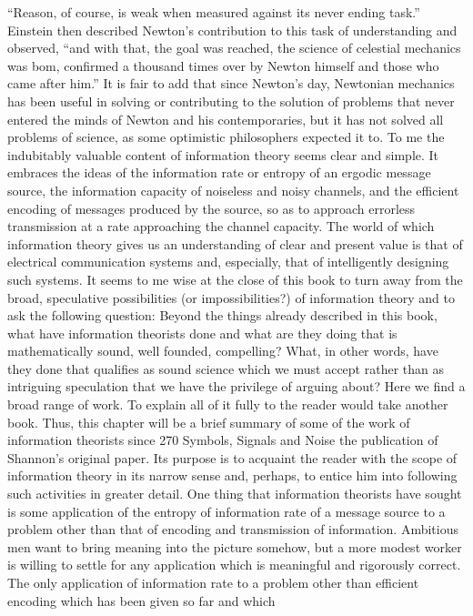 {{{{{{{{{{{{“Reason, of course, is weak when measured against its never
ending task.” Einstein then described Newton’s contribution to
this task of understanding and observed, “and with that, the goal
was reached, the science of celestial mechanics was bom, confirmed
a thousand times over by Newton himself and those who came
after him.”
It is fair to add that since Newton’s day, Newtonian mechanics
has been useful in solving or contributing to the solution of problems
that never entered the minds of Newton and his contemporaries,
but it has not solved all problems of science, as some
optimistic philosophers expected it to.
To me the indubitably valuable content of information theory
seems clear and simple. It embraces the ideas of the information
rate or entropy of an ergodic message source, the information
capacity of noiseless and noisy channels, and the efficient encoding
of messages produced by the source, so as to approach errorless
transmission at a rate approaching the channel capacity. The
world of which information theory gives us an understanding of
clear and present value is that of electrical communication systems
and, especially, that of intelligently designing such systems.
It seems to me wise at the close of this book to turn away from
the broad, speculative possibilities (or impossibilities?) of information
theory and to ask the following question: Beyond the things
already described in this book, what have information theorists
done and what are they doing that is mathematically sound, well
founded, compelling? What, in other words, have they done that
qualifies as sound science which we must accept rather than as
intriguing speculation that we have the privilege of arguing about?
Here we find a broad range of work. To explain all of it fully to
the reader would take another book. Thus, this chapter will be a
brief summary of some of the work of information theorists since
270
Symbols, Signals and Noise
the publication of Shannon’s original paper. Its purpose is to
acquaint the reader with the scope of information theory in its
narrow sense and, perhaps, to entice him into following such
activities in greater detail.
One thing that information theorists have sought is some application
of the entropy of information rate of a message source to a
problem other than that of encoding and transmission of information.
Ambitious men want to bring meaning into the picture
somehow, but a more modest worker is willing to settle for any
application which is meaningful and rigorously correct.
The only application of information rate to a problem other
than efficient encoding which has been given so far and which
}}}}}}}}}}}}
